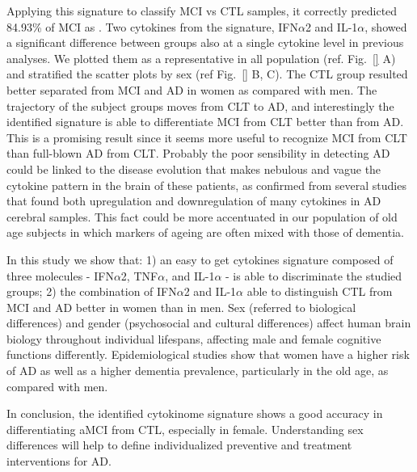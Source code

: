 \documentclass{standalone}
\begin{document}

Applying this signature to classify MCI vs CTL samples, it correctly predicted 84.93\% of MCI as .
Two cytokines from the signature, IFN$\alpha$2 and IL-1$\alpha$, showed a significant difference between groups also at a single cytokine level in previous analyses.
We plotted them as a representative in all population (ref. Fig.~\ref{} A) and stratified the scatter plots by sex (ref Fig.~\ref{} B, C).
The CTL group resulted better separated from MCI and AD in women as compared with men.
The trajectory of the subject groups moves from CLT to AD, and interestingly the identified signature is able to differentiate MCI from CLT better than from AD.
This is a promising result since it seems more useful to recognize MCI from CLT than full-blown AD from CLT.
Probably the poor sensibility in detecting AD could be linked to the disease evolution that makes nebulous and vague the cytokine pattern in the brain of these patients, as confirmed from several studies that found both upregulation and downregulation of many cytokines in AD cerebral samples.
This fact could be more accentuated in our population of old age subjects in which markers of ageing are often mixed with those of dementia.

In this study we show that: 1) an easy to get cytokines signature composed of three molecules - IFN$\alpha$2, TNF$\alpha$, and IL-1$\alpha$ - is able to discriminate the studied groups;  2) the combination of IFN$\alpha$2 and IL-1$\alpha$ able to distinguish CTL from  MCI and AD better in women than in men.
Sex (referred to biological differences) and gender (psychosocial and cultural differences) affect human brain biology throughout individual lifespans, affecting male and female cognitive functions differently.
Epidemiological studies show that women have a higher risk of AD as well as a higher dementia prevalence, particularly in the old age, as compared with men.

In conclusion, the identified cytokinome signature shows a good accuracy in differentiating aMCI from CTL, especially in female.
Understanding sex differences will help to define individualized preventive and treatment interventions for AD.
\end{document}
